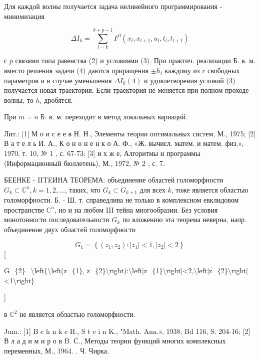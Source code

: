 \documentclass[10pt]{article}
\begin{document}
Для каждой волны получается задача нелинейного программирования - минимизация



\[

\Delta I_{k}=\sum_{l=k}^{k+p-1} F^{0}\left(x_{l}, x_{l+1}, u_{l}, t_{l}, t_{l+1}\right)

\]



с $p$ связями типа равенства (2) и условиями (3). При практич. реализации Б. в. м. вместо решения задачи (4) даются приращения $\pm h_{i}$ каждому из $r$ свободных параметров и в случае уменьшения $\Delta I_{k}(4)$ и удовлетворения условий (3) получается новая траектория. Если траектория не меняется при полном проходе волны, то $h_{i}$ дробятся.



При $m=n$ Б. в. м. переходит в метод локальных вариаций.



Лит.: [1] М о и с е е в Н. Н., Элементы теории оптимальных систем, М., 1975; [2] В а т е л ь И. А., К о н о н е н к о А. Ф., «Ж. вычисл. матем. и матем. физ.», 1970, т. 10, № 1 , с. 67-73; [3] и х ж е, Алгоритмы и программы (Информационный бюллетень), М., 1972, № 2 , с. 7.



БЕЕНКЕ - IITEИНА ТЕОРЕМА: объединение областей голоморфности $G_{k} \subset \mathbb{C}^{n}, k=1,2, \ldots$, таких, что $G_{k} \subset G_{k+1}$ для всех $k$, тоже является областью голоморфности. Б. - Ш. т. справедлива не только в комплексном евклидовом пространстве $\mathbb{C}^{n}$, но и на любом III тейна многообразии. Без условия монотонности последовательности $G_{k}$ по вложению эта теорема неверна, напр. объединение двух областей голоморфности



\[

G_{1}=\left\{\left(z_{1}, z_{2}\right):\left|z_{1}\right|<1,\left|z_{2}\right|<2\right\}

\][



G\_\{2\}=\textbackslash left\{\textbackslash left(z\_\{1\}, z\_\{2\}\textbackslash right):\textbackslash left|z\_\{1\}\textbackslash right|<2,\textbackslash left|z\_\{2\}\textbackslash right|<1\textbackslash right\}

]



в $\mathbb{C}^{2}$ не является областью голоморфности.



Jum.: [1] B e h n k e H., S t e i n K., "Math. Ann.», 1938, Bd 116, S. 204-16; [2] В л а д и м и р о в B. С., Методы теории функций многих комплексных переменных, М., 1964. . Ч. Чирка.
\end{document}
